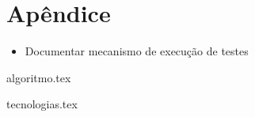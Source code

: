 \section{Apêndice}

\begin{itemize}
	\item Documentar mecanismo de execução de testes
\end{itemize}

{algoritmo.tex}

{tecnologias.tex}
